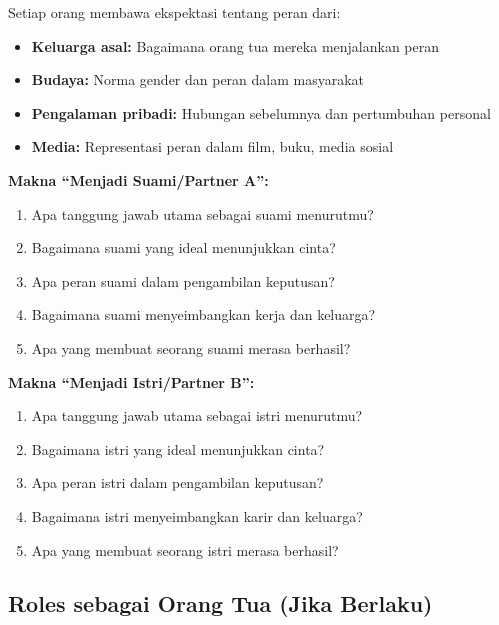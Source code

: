 Setiap orang membawa ekspektasi tentang peran dari:
\begin{itemize}
    \item \textbf{Keluarga asal:} Bagaimana orang tua mereka menjalankan peran
    \item \textbf{Budaya:} Norma gender dan peran dalam masyarakat
    \item \textbf{Pengalaman pribadi:} Hubungan sebelumnya dan pertumbuhan personal
    \item \textbf{Media:} Representasi peran dalam film, buku, media sosial
\end{itemize}

\begin{praktikbox}
\textbf{Makna ``Menjadi Suami/Partner A'':}
\begin{enumerate}
    \item Apa tanggung jawab utama sebagai suami menurutmu?
    \item Bagaimana suami yang ideal menunjukkan cinta?
    \item Apa peran suami dalam pengambilan keputusan?
    \item Bagaimana suami menyeimbangkan kerja dan keluarga?
    \item Apa yang membuat seorang suami merasa berhasil?
\end{enumerate}

\textbf{Makna ``Menjadi Istri/Partner B'':}
\begin{enumerate}
    \item Apa tanggung jawab utama sebagai istri menurutmu?
    \item Bagaimana istri yang ideal menunjukkan cinta?
    \item Apa peran istri dalam pengambilan keputusan?
    \item Bagaimana istri menyeimbangkan karir dan keluarga?
    \item Apa yang membuat seorang istri merasa berhasil?
\end{enumerate}
\end{praktikbox}

\subsection{Roles sebagai Orang Tua (Jika Berlaku)}

